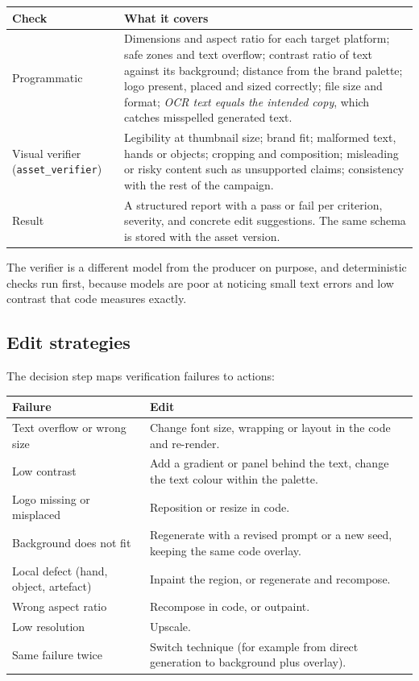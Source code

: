 \documentclass[11pt,a4paper]{article}
\begin{document}
\begin{longtable}{@{}p{4.0cm}p{11.3cm}@{}}
\toprule
\textbf{Check} & \textbf{What it covers}\\
\midrule
\endhead
Programmatic & Dimensions and aspect ratio for each target platform; safe zones and text overflow; contrast ratio of text against its background; distance from the brand palette; logo present, placed and sized correctly; file size and format; \emph{OCR text equals the intended copy}, which catches misspelled generated text.\\
Visual verifier (\texttt{asset\_verifier}) & Legibility at thumbnail size; brand fit; malformed text, hands or objects; cropping and composition; misleading or risky content such as unsupported claims; consistency with the rest of the campaign.\\
Result & A structured report with a pass or fail per criterion, severity, and concrete edit suggestions. The same schema is stored with the asset version.\\
\bottomrule
\end{longtable}
The verifier is a different model from the producer on purpose, and deterministic checks run first, because models are poor at noticing small text errors and low contrast that code measures exactly.

\subsection{Edit strategies}
The decision step maps verification failures to actions:
\begin{longtable}{@{}p{5.0cm}p{10.3cm}@{}}
\toprule
\textbf{Failure} & \textbf{Edit}\\
\midrule
\endhead
Text overflow or wrong size & Change font size, wrapping or layout in the code and re-render.\\
Low contrast & Add a gradient or panel behind the text, change the text colour within the palette.\\
Logo missing or misplaced & Reposition or resize in code.\\
Background does not fit & Regenerate with a revised prompt or a new seed, keeping the same code overlay.\\
Local defect (hand, object, artefact) & Inpaint the region, or regenerate and recompose.\\
Wrong aspect ratio & Recompose in code, or outpaint.\\
Low resolution & Upscale.\\
Same failure twice & Switch technique (for example from direct generation to background plus overlay).\\
\bottomrule
\end{longtable}
\end{document}
